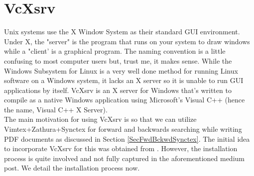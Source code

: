 \section{VcXsrv}
Unix systems use the X Window System as their standard GUI environment.  Under
X, the "server" is the program that runs on your system to draw windows while a
"client' is a graphical program. The naming convention is a little confusing to
most computer users but, trust me, it makes sense.  While the Windows Subsystem
for Linux is a very well done method for running Linux software on a Windows
system, it lacks an X server so it is unable to run GUI applications by itself.
VcXsrv is an X server for Windows that's written to compile as a native Windows
application using Microsoft's Visual C++ (hence the name, Visual C++ X
Server).\\

The main motivation for using VcXsrv is so that we can utilize
Vimtex+Zathura+Synctex for forward and backwards searching while writing PDF
documents as discussed in Section \ref{SecFwdBckwdSynctex}. The initial idea to
incorporate VcXsrv for this was obtained from \cite{jong2020blazing}. However,
the installation process is quite involved and not fully captured in the
aforementioned medium post. We detail the installation process now.

